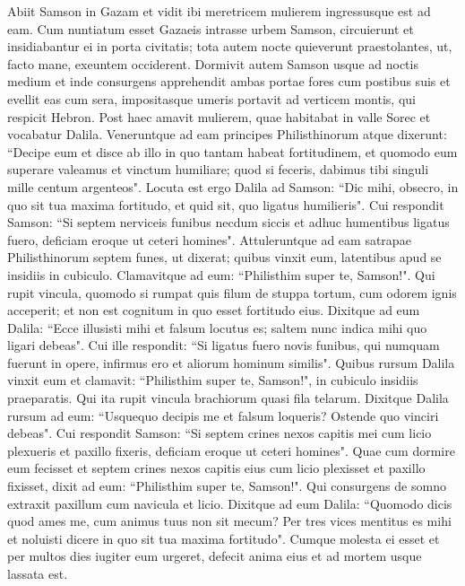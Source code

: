 \begin{biblechapter}  
\verse Abiit Samson in Gazam et vidit ibi meretricem mulierem ingressusque est ad eam. 
\verse Cum nuntiatum esset Gazaeis intrasse urbem Samson, circuierunt et insidiabantur ei in porta civitatis; tota autem nocte quieverunt praestolantes, ut, facto mane, exeuntem occiderent. 
\verse Dormivit autem Samson usque ad noctis medium et inde consurgens apprehendit ambas portae fores cum postibus suis et evellit eas cum sera, impositasque umeris portavit ad verticem montis, qui respicit Hebron. 
\verse Post haec amavit mulierem, quae habitabat in valle Sorec et vocabatur Dalila. 
\verse Veneruntque ad eam principes Philisthinorum atque dixerunt: “Decipe eum et disce ab illo in quo tantam habeat fortitudinem, et quomodo eum superare valeamus et vinctum humiliare; quod si feceris, dabimus tibi singuli mille centum argenteos". 
\verse Locuta est ergo Dalila ad Samson: “Dic mihi, obsecro, in quo sit tua maxima fortitudo, et quid sit, quo ligatus humilieris". 
\verse Cui respondit Samson: “Si septem nerviceis funibus necdum siccis et adhuc humentibus ligatus fuero, deficiam eroque ut ceteri homines". 
\verse Attuleruntque ad eam satrapae Philisthinorum septem funes, ut dixerat; quibus vinxit eum, 
\verse latentibus apud se insidiis in cubiculo. Clamavitque ad eum: “Philisthim super te, Samson!". Qui rupit vincula, quomodo si rumpat quis filum de stuppa tortum, cum odorem ignis acceperit; et non est cognitum in quo esset fortitudo eius. 
\verse Dixitque ad eum Dalila: “Ecce illusisti mihi et falsum locutus es; saltem nunc indica mihi quo ligari debeas". 
\verse Cui ille respondit: “Si ligatus fuero novis funibus, qui numquam fuerunt in opere, infirmus ero et aliorum hominum similis". 
\verse Quibus rursum Dalila vinxit eum et clamavit: “Philisthim super te, Samson!", in cubiculo insidiis praeparatis. Qui ita rupit vincula brachiorum quasi fila telarum. 
\verse Dixitque Dalila rursum ad eum: “Usquequo decipis me et falsum loqueris? Ostende quo vinciri debeas". Cui respondit Samson: “Si septem crines nexos capitis mei cum licio plexueris et paxillo fixeris, deficiam eroque ut ceteri homines". 
\verse Quae cum dormire eum fecisset et septem crines nexos capitis eius cum licio plexisset et paxillo fixisset, dixit ad eum: “Philisthim super te, Samson!". Qui consurgens de somno extraxit paxillum cum navicula et licio. 
\verse Dixitque ad eum Dalila: “Quomodo dicis quod ames me, cum animus tuus non sit mecum? Per tres vices mentitus es mihi et noluisti dicere in quo sit tua maxima fortitudo". 
\verse Cumque molesta ei esset et per multos dies iugiter eum urgeret, defecit anima eius et ad mortem usque lassata est. 

\end{biblechapter}
